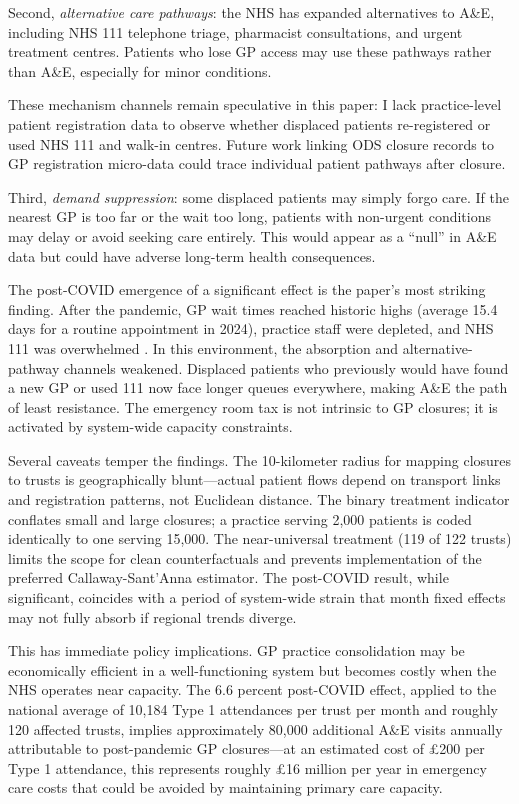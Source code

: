 \documentclass[12pt]{article}
\begin{document}
Second, \textit{alternative care pathways}: the NHS has expanded alternatives to A\&E, including NHS 111 telephone triage, pharmacist consultations, and urgent treatment centres. Patients who lose GP access may use these pathways rather than A\&E, especially for minor conditions.

These mechanism channels remain speculative in this paper: I lack practice-level patient registration data to observe whether displaced patients re-registered or used NHS 111 and walk-in centres. Future work linking ODS closure records to GP registration micro-data could trace individual patient pathways after closure.

Third, \textit{demand suppression}: some displaced patients may simply forgo care. If the nearest GP is too far or the wait too long, patients with non-urgent conditions may delay or avoid seeking care entirely. This would appear as a ``null'' in A\&E data but could have adverse long-term health consequences.

The post-COVID emergence of a significant effect is the paper's most striking finding. After the pandemic, GP wait times reached historic highs (average 15.4 days for a routine appointment in 2024), practice staff were depleted, and NHS 111 was overwhelmed \citep{bma2023pressures}. In this environment, the absorption and alternative-pathway channels weakened. Displaced patients who previously would have found a new GP or used 111 now face longer queues everywhere, making A\&E the path of least resistance. The emergency room tax is not intrinsic to GP closures; it is activated by system-wide capacity constraints.

Several caveats temper the findings. The 10-kilometer radius for mapping closures to trusts is geographically blunt---actual patient flows depend on transport links and registration patterns, not Euclidean distance. The binary treatment indicator conflates small and large closures; a practice serving 2,000 patients is coded identically to one serving 15,000. The near-universal treatment (119 of 122 trusts) limits the scope for clean counterfactuals and prevents implementation of the preferred Callaway-Sant'Anna estimator. The post-COVID result, while significant, coincides with a period of system-wide strain that month fixed effects may not fully absorb if regional trends diverge.

This has immediate policy implications. GP practice consolidation may be economically efficient in a well-functioning system but becomes costly when the NHS operates near capacity. The 6.6 percent post-COVID effect, applied to the national average of 10,184 Type 1 attendances per trust per month and roughly 120 affected trusts, implies approximately 80,000 additional A\&E visits annually attributable to post-pandemic GP closures---at an estimated cost of \pounds 200 per Type 1 attendance, this represents roughly \pounds 16 million per year in emergency care costs that could be avoided by maintaining primary care capacity.
\end{document}
